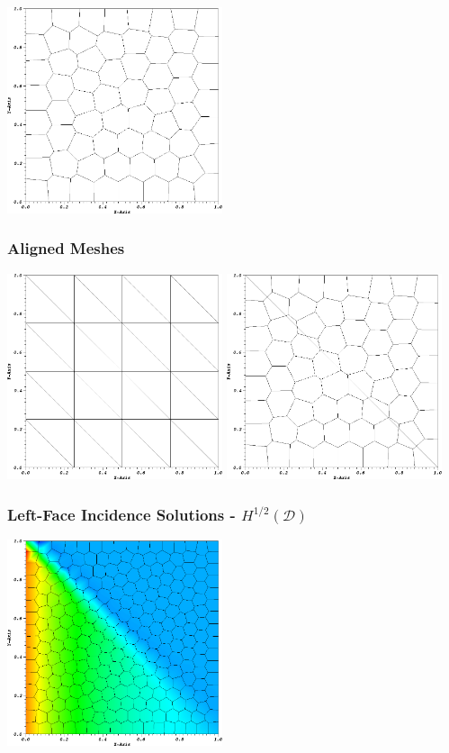 \documentclass[compress,10pt]{beamer}
\begin{document}
\begin{frame}[t]
{{}\includegraphics[width=0.475\textwidth]{images/PAMesh_Poly.png}
}
{
\frametitle{Aligned Meshes}
\vspace{0.75cm}
\hspace*{0.25cm}
{}\includegraphics[width=0.475\textwidth]{images/PAMesh_Tri.png} 
{}\includegraphics[width=0.475\textwidth]{images/PAMesh_SplitPoly.png}
}
{
\frametitle{Left-Face Incidence Solutions - $H^{1/2} (\mathcal{D})$}
\vspace{0.75cm}
\hspace*{0.25cm}
{}\includegraphics[width=0.475\textwidth]{images/PALeftSol_Poly.png} 
}
\end{frame}
\end{document}
